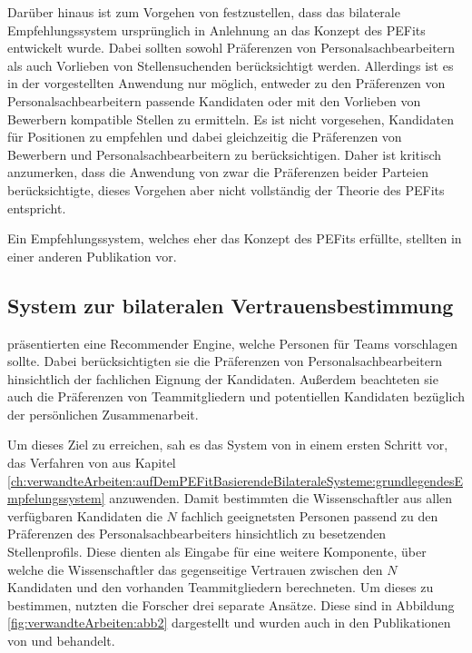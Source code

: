 Darüber hinaus ist zum Vorgehen von \textcite[S. 3ff.]{malinowski:2006} festzustellen, dass das bilaterale Empfehlungssystem ursprünglich in Anlehnung an das Konzept des \acp{PEFit} entwickelt wurde. Dabei sollten sowohl Präferenzen von Personalsachbearbeitern als auch Vorlieben von Stellensuchenden berücksichtigt werden. Allerdings ist es in der vorgestellten Anwendung nur möglich, entweder zu den Präferenzen von Personalsachbearbeitern passende Kandidaten oder mit den Vorlieben von Bewerbern kompatible Stellen zu ermitteln. Es ist nicht vorgesehen, Kandidaten für Positionen zu empfehlen und dabei gleichzeitig die Präferenzen von Bewerbern und Personalsachbearbeitern zu berücksichtigen. Daher ist kritisch anzumerken, dass die Anwendung von \textcite[S. 3ff.]{malinowski:2006} zwar die Präferenzen beider Parteien berücksichtigte, dieses Vorgehen aber nicht vollständig der Theorie des \acp{PEFit} entspricht.

Ein Empfehlungssystem, welches eher das Konzept des \acp{PEFit} erfüllte, stellten \textcite[S. 1ff.]{malinowski:2005} in einer anderen Publikation vor.

\subsection{System zur bilateralen Vertrauensbestimmung}
\label{ch:verwandteArbeiten:aufDemPEFitBasierendeBilateraleSysteme:bilateraleVertrauensbestimmung}
\textcite[S. 1]{malinowski:2005} präsentierten eine Recommender Engine, welche Personen für Teams vorschlagen sollte. Dabei berücksichtigten sie die Präferenzen von Personalsachbearbeitern hinsichtlich der fachlichen Eignung der Kandidaten. Außerdem beachteten sie auch die Präferenzen von Teammitgliedern und potentiellen Kandidaten bezüglich der persönlichen Zusammenarbeit.

Um dieses Ziel zu erreichen, sah es das System von \textcite[S. 4ff.]{malinowski:2005} in einem ersten Schritt vor, das Verfahren von \textcite[S. 8ff.]{faerber:2003} aus Kapitel \ref{ch:verwandteArbeiten:aufDemPEFitBasierendeBilateraleSysteme:grundlegendesEmpfelungssystem} anzuwenden. Damit bestimmten die Wissenschaftler aus allen verfügbaren Kandidaten die $N$ fachlich geeignetsten Personen passend zu den Präferenzen des Personalsachbearbeiters hinsichtlich zu besetzenden Stellenprofils. Diese dienten als Eingabe für eine weitere Komponente, über welche die Wissenschaftler das gegenseitige Vertrauen zwischen den $N$ Kandidaten und den vorhanden Teammitgliedern berechneten. Um dieses zu bestimmen, nutzten die Forscher drei separate Ansätze. Diese sind in Abbildung \ref{fig:verwandteArbeiten:abb2} dargestellt und wurden auch in den Publikationen von \textcite[S. 5ff.]{keim:2005} und \textcite[S. 6ff.]{malinowski:2008} behandelt.

